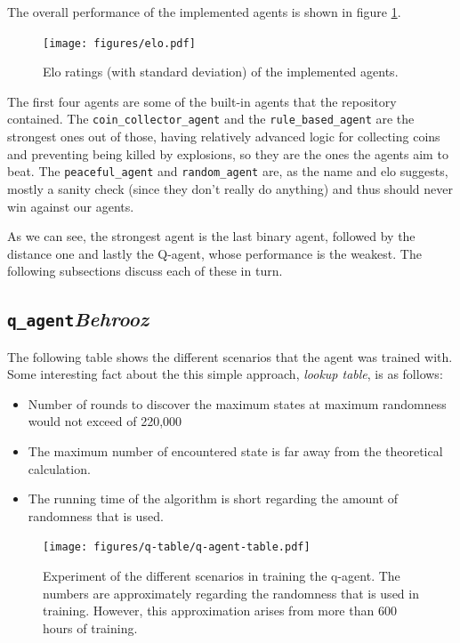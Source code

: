 \documentclass{article}
\begin{document}
The overall performance of the implemented agents is shown in figure \ref{fig:elos}.

\begin{figure}[h]
    \centering
    \texttt{[image: figures/elo.pdf]}
    \caption{Elo ratings (with standard deviation) of the implemented agents.}
    \label{fig:elos}
\end{figure}

The first four agents are some of the built-in agents that the repository contained.
The \texttt{coin\_collector\_agent} and the \texttt{rule\_based\_agent} are the strongest ones out of those, having relatively advanced logic for collecting coins and preventing being killed by explosions, so they are the ones the agents aim to beat.
The \texttt{peaceful\_agent} and \texttt{random\_agent} are, as the name and elo suggests, mostly a sanity check (since they don't really do anything) and thus should never win against our agents.

As we can see, the strongest agent is the last binary agent, followed by the distance one and lastly the Q-agent, whose performance is the weakest.
The following subsections discuss each of these in turn.


\clearpage

\subsection[\texttt{q\_agent}]{\texttt{q\_agent}{\normalsize \normalfont \it \hfill Behrooz}}


The following table shows the different scenarios that the agent was trained with. Some interesting fact about the this simple approach, \textit{lookup table}, is as follows:

\begin{itemize}
    \item Number of rounds to discover the maximum states at maximum randomness would not exceed of 220,000 
   \item The maximum number of encountered state is far away from the theoretical calculation.
    \item The running time of the algorithm is short regarding the amount of randomness that is used.
\end{itemize}

\begin{figure}[h]
    \centering
    \texttt{[image: figures/q-table/q-agent-table.pdf]}
    \caption{Experiment of the different scenarios in training the q-agent. The numbers are approximately regarding the randomness that is used in training. However, this approximation arises from more than 600 hours of training.}
    \label{fig:q-agent-table}
\end{figure}
\end{document}
